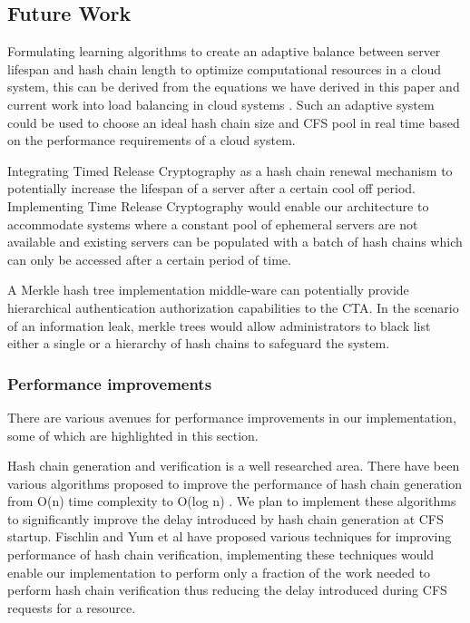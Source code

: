 \documentclass[a4paper,twoside]{article}
\begin{document}
\subsection{Future Work}

Formulating learning algorithms to create an adaptive balance between server lifespan and hash chain length to optimize computational resources in a cloud system, this can be derived from the equations we have derived in this paper and current work into load balancing in cloud systems \cite{randles_comparative_2010}. Such an adaptive system could be used to choose an ideal hash chain size and CFS pool in real time based on the performance requirements of a cloud system.

Integrating Timed Release Cryptography \cite{chalkias_timed_2006} as a hash chain renewal mechanism to potentially increase the lifespan of a server after a certain cool off period. Implementing Time Release Cryptography would enable our architecture to accommodate systems where a constant pool of ephemeral servers are not available and existing servers can be populated with a batch of hash chains which can only be accessed after a certain period of time. 

A Merkle hash tree implementation middle-ware can potentially provide hierarchical authentication authorization \cite{yi_cloud_2012} capabilities to the CTA. In the scenario of an information leak, merkle trees would allow administrators to black list either a single or a hierarchy of hash chains to safeguard the system.

\subsubsection{Performance improvements}

There are various avenues for performance improvements in our implementation, some of which are highlighted in this section. 

Hash chain generation and verification is a well researched area. There have been various algorithms proposed to improve the performance of hash chain generation from O(n) time complexity to O(log n) \cite{coppersmith_almost_2002, jakobsson_fractal_2002, kim_improved_2003, sella_computation-storage_2003, yum_single-layer_2009}. We plan to implement these algorithms to significantly improve the delay introduced by hash chain generation at CFS startup. Fischlin and Yum et al \cite{fischlin_fast_2004, yum_fast_2010} have proposed various techniques for improving performance of hash chain verification, implementing these techniques would enable our implementation to perform only a fraction of the work needed to perform hash chain verification thus reducing the delay introduced during CFS requests for a resource. 
\end{document}
